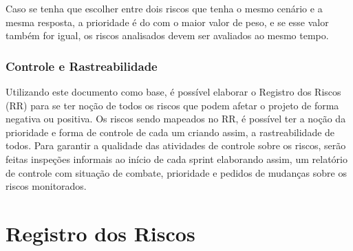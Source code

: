\begin{apendicesenv}
Caso se tenha que escolher entre dois riscos que tenha o mesmo cenário e a mesma resposta, a prioridade é do com o maior valor de peso, e se esse valor também for igual, os riscos analisados devem ser avaliados ao mesmo tempo.

\subsection{Controle e Rastreabilidade}
Utilizando este documento como base, é possível elaborar o Registro dos Riscos (RR) para se ter noção de todos os riscos que podem afetar o projeto de forma negativa ou positiva. Os riscos sendo mapeados no RR, é possível ter a noção da prioridade e forma de controle de cada um criando assim, a rastreabilidade de todos. Para garantir a qualidade das atividades de controle sobre os riscos, serão feitas inspeções informais ao início de cada sprint elaborando assim, um relatório de controle com situação de combate, prioridade e pedidos de mudanças sobre os riscos monitorados.

\chapter{Registro dos Riscos}


\end{apendicesenv}
